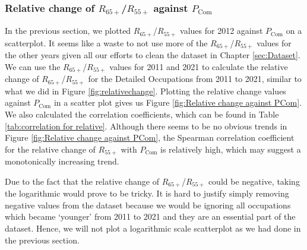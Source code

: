 \documentclass[11pt]{article}
\begin{document}
\subsubsection*{Relative change of $R_{65+}$/$R_{55+}$ against $P_{\text{Com}}$}
In the previous section, we plotted $R_{65+}$/$R_{55+}$ values for 2012 against $P_{\text{Com}}$ on a scatterplot. It seems like a waste to not use more of the $R_{65+}$/$R_{55+}$ values for the other years given all our efforts to clean the dataset in Chapter \ref{sec:Dataset}. We can use the $R_{65+}$/$R_{55+}$ values for 2011 and 2021 to calculate the relative change of $R_{65+}$/$R_{55+}$ for the Detailed Occupations from 2011 to 2021, similar to what we did in Figure \ref{fig:relativechange}. Plotting the relative change values against $P_{\text{Com}}$ in a scatter plot gives us Figure \ref{fig:Relative change against PCom}. We also calculated the correlation coefficients, which can be found in Table \ref{tab:correlation for relative}. Although there seems to be no obvious trends in Figure \ref{fig:Relative change against PCom}, the Spearman correlation coefficient for the relative change of $R_{55+}$ with $P_{\text{Com}}$ is relatively high, which may suggest a monotonically increasing trend.

Due to the fact that the relative change of $R_{65+}$/$R_{55+}$ could be negative, taking the logarithmic would prove to be tricky. It is hard to justify simply removing negative values from the dataset because we would be ignoring all occupations which became `younger' from 2011 to 2021 and they are an essential part of the dataset. Hence, we will not plot a logarithmic scale scatterplot as we had done in the previous section.
\end{document}
